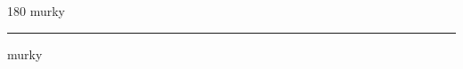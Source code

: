 
\begin{frame}
\begin{center}
\begin{turn}{180}
{\fontsize{2.5cm}{1em}\selectfont murky}
\end{turn}
\vspace{1em}\par  
\hrule
\vspace{1em}\par  
{\fontsize{2.5cm}{1em}\selectfont murky}
\end{center}
\end{frame}
